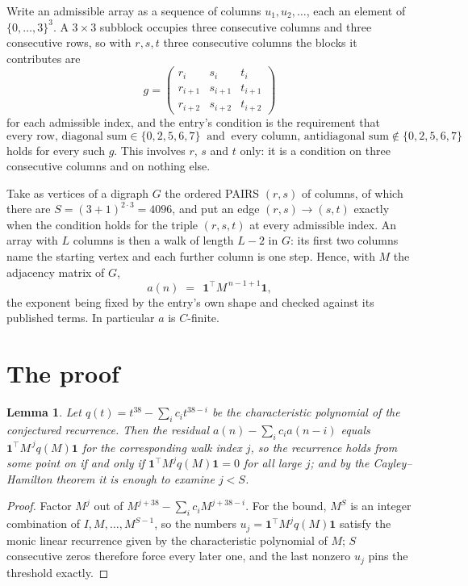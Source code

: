 \documentclass[11pt,a4paper]{article}
\theoremstyle{plain}
\newtheorem{lemma}[theorem]{Lemma}
\theoremstyle{definition}
\begin{document}
Write an admissible array as a sequence of columns $u_1,u_2,\dots$, each an element of
$\{0,\dots,3\}^{3}$. A $3\times3$ subblock occupies three consecutive columns and
three consecutive rows, so with $r,s,t$ three consecutive columns the blocks it
contributes are
\[
g=\begin{pmatrix}r_i&s_i&t_i\\ r_{i+1}&s_{i+1}&t_{i+1}\\ r_{i+2}&s_{i+2}&t_{i+2}\end{pmatrix}
\]
for each admissible index, and the entry's condition is the requirement that
\[
\text{every row, diagonal sum} \in \{0,2,5,6,7\}\ \text{ and }\ \text{every column, antidiagonal sum} \notin \{0,2,5,6,7\}
\]
holds for every such $g$. This involves $r$, $s$ and $t$ only: it is a condition on
three consecutive columns and on nothing else.

Take as vertices of a digraph $G$ the ordered PAIRS $(r,s)$ of columns, of which there are
$S=(3+1)^{2\cdot3}=4096$, and put an edge $(r,s)\to(s,t)$ exactly when the condition
holds for the triple $(r,s,t)$ at every admissible index. An array with $L$ columns is then a
walk of length $L-2$ in $G$: its first two columns name the starting vertex and each further
column is one step. Hence, with $M$ the adjacency matrix of $G$,
\[
a(n)\;=\;\,\mathbf{1}^{\!\top}M^{\,n-1+1}\mathbf{1},
\]
the exponent being fixed by the entry's own shape and checked against its published terms.
In particular $a$ is $C$-finite.

\section{The proof}

\begin{lemma}\label{lem:crit}
Let $q(t)=t^{38}-\sum_i c_it^{38-i}$ be the characteristic polynomial of the
conjectured recurrence. Then the residual $a(n)-\sum_ic_ia(n-i)$ equals
$\mathbf{1}^{\!\top}M^{\,j}q(M)\mathbf{1}$ for the corresponding walk index
$j$, so the recurrence holds from some point on if and only if
$\mathbf{1}^{\!\top}M^{j}q(M)\mathbf{1}=0$ for all large $j$; and by the
Cayley--Hamilton theorem it is enough to examine $j<S$.
\end{lemma}

\begin{proof}
Factor $M^{j}$ out of $M^{j+38}-\sum_ic_iM^{j+38-i}$. For the bound, $M^{S}$
is an integer combination of $I,M,\dots,M^{S-1}$, so the numbers
$u_j=\mathbf{1}^{\!\top}M^{j}q(M)\mathbf{1}$ satisfy the monic linear recurrence given by
the characteristic polynomial of $M$; $S$ consecutive zeros therefore force every later one,
and the last nonzero $u_j$ pins the threshold exactly.
\end{proof}
\end{document}
